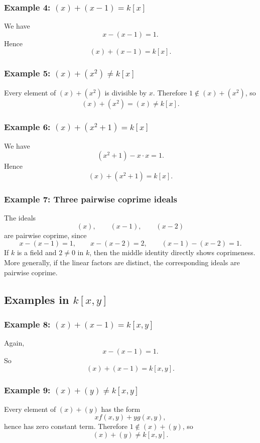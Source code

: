 \documentclass[12pt,a4paper]{article}
\theoremstyle{notespace}
\begin{document}
\subsubsection*{Example 4: \((x)+(x-1)=k[x]\)}

We have
\[
x-(x-1)=1.
\]
Hence
\[
(x)+(x-1)=k[x].
\]

\subsubsection*{Example 5: \((x)+(x^2)\neq k[x]\)}

Every element of \((x)+(x^2)\) is divisible by \(x\). Therefore \(1\notin (x)+(x^2)\), so
\[
(x)+(x^2)=(x)\neq k[x].
\]

\subsubsection*{Example 6: \((x)+(x^2+1)=k[x]\)}

We have
\[
(x^2+1)-x\cdot x=1.
\]
Hence
\[
(x)+(x^2+1)=k[x].
\]

\subsubsection*{Example 7: Three pairwise coprime ideals}

The ideals
\[
(x),\qquad (x-1),\qquad (x-2)
\]
are pairwise coprime, since
\[
x-(x-1)=1,
\qquad
x-(x-2)=2,
\qquad
(x-1)-(x-2)=1.
\]
If \(k\) is a field and \(2\neq 0\) in \(k\), then the middle identity directly shows coprimeness. More generally, if the linear factors are distinct, the corresponding ideals are pairwise coprime.

\subsection{Examples in \(k[x,y]\)}

\subsubsection*{Example 8: \((x)+(x-1)=k[x,y]\)}

Again,
\[
x-(x-1)=1.
\]
So
\[
(x)+(x-1)=k[x,y].
\]

\subsubsection*{Example 9: \((x)+(y)\neq k[x,y]\)}

Every element of \((x)+(y)\) has the form
\[
xf(x,y)+yg(x,y),
\]
hence has zero constant term. Therefore \(1\notin (x)+(y)\), so
\[
(x)+(y)\neq k[x,y].
\]
\end{document}
